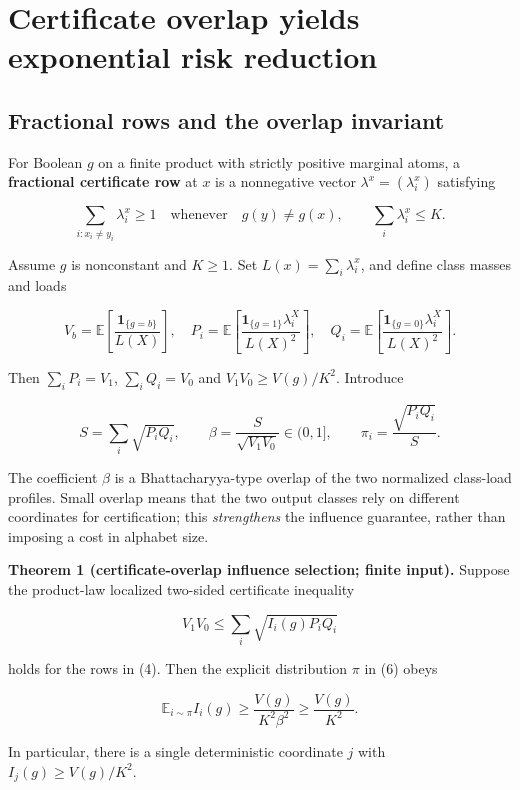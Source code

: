 \documentclass[
  10pt,
]{article}
\begin{document}
\section{Certificate overlap yields exponential risk
reduction}\label{certificate-overlap-yields-exponential-risk-reduction}

\subsection{Fractional rows and the overlap
invariant}\label{fractional-rows-and-the-overlap-invariant}

For Boolean \(g\) on a finite product with strictly positive marginal
atoms, a \textbf{fractional certificate row} at \(x\) is a nonnegative
vector \(\lambda^x=(\lambda_i^x)\) satisfying

\[
\sum_{i:x_i\ne y_i}\lambda_i^x\ge1
\quad\text{whenever}\quad g(y)\ne g(x),
\qquad \sum_i\lambda_i^x\le K. \tag{4}
\]

Assume \(g\) is nonconstant and \(K\ge1\). Set
\(L(x)=\sum_i\lambda_i^x\), and define class masses and loads

\[
V_b=\mathbb E\!\left[\frac{\mathbf1_{\{g=b\}}}{L(X)}\right],\quad
P_i=\mathbb E\!\left[\frac{\mathbf1_{\{g=1\}}\lambda_i^X}{L(X)^2}\right],\quad
Q_i=\mathbb E\!\left[\frac{\mathbf1_{\{g=0\}}\lambda_i^X}{L(X)^2}\right]. \tag{5}
\]

Then \(\sum_iP_i=V_1\), \(\sum_iQ_i=V_0\) and \(V_1V_0\ge V(g)/K^2\).
Introduce

\[
S=\sum_i\sqrt{P_iQ_i},\qquad
\beta=\frac{S}{\sqrt{V_1V_0}}\in(0,1],\qquad
\pi_i=\frac{\sqrt{P_iQ_i}}{S}. \tag{6}
\]

The coefficient \(\beta\) is a Bhattacharyya-type overlap of the two
normalized class-load profiles. Small overlap means that the two output
classes rely on different coordinates for certification; this
\emph{strengthens} the influence guarantee, rather than imposing a cost
in alphabet size.

\textbf{Theorem 1 (certificate-overlap influence selection; finite
input).} Suppose the product-law localized two-sided certificate
inequality

\[
V_1V_0\le\sum_i\sqrt{I_i(g)P_iQ_i} \tag{7}
\]

holds for the rows in (4). Then the explicit distribution \(\pi\) in (6)
obeys

\[
\boxed{\mathbb E_{i\sim\pi}I_i(g)\ge\frac{V(g)}{K^2\beta^2}\ge\frac{V(g)}{K^2}.} \tag{8}
\]

In particular, there is a single deterministic coordinate \(j\) with
\(I_j(g)\ge V(g)/K^2\).
\end{document}

